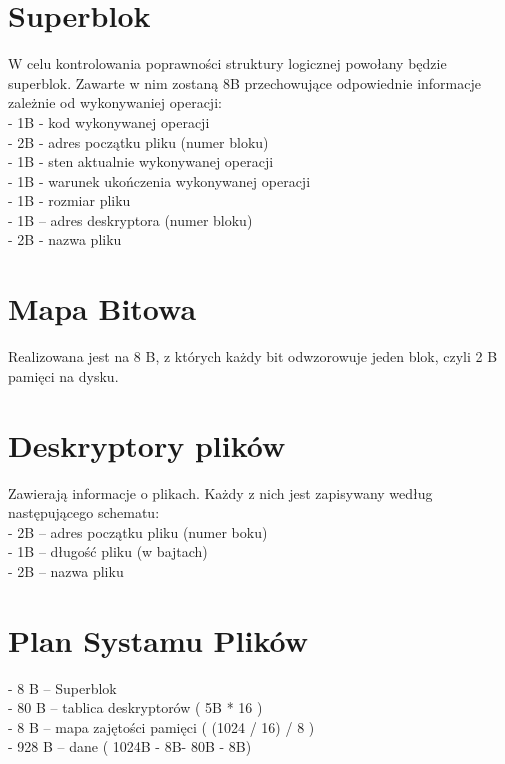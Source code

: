 \documentclass[paper=a4, fontsize=11pt]{scrartcl} %
\numberwithin{equation}{section} %
\numberwithin{figure}{section} %
\numberwithin{table}{section} %
\begin{document}
\section{Superblok}
W celu kontrolowania poprawności struktury logicznej powołany będzie superblok. Zawarte w nim zostaną 8B przechowujące odpowiednie informacje zależnie od wykonywaniej operacji:\\
- 1B - kod wykonywanej operacji\\
- 2B - adres początku pliku (numer bloku)\\
- 1B - sten aktualnie wykonywanej operacji\\
- 1B - warunek ukończenia wykonywanej operacji\\
- 1B - rozmiar pliku\\
- 1B – adres deskryptora (numer bloku)\\
- 2B - nazwa pliku\\

\section{Mapa Bitowa}
Realizowana jest na 8 B, z których każdy bit odwzorowuje jeden blok, czyli 2 B pamięci na dysku.

\section{Deskryptory plików}
Zawierają informacje o plikach. Każdy z nich jest zapisywany według następującego schematu:\\
- 2B – adres początku pliku (numer boku)\\
- 1B – długość pliku (w bajtach)\\ 
- 2B – nazwa pliku\\

\section{Plan Systamu Plików}
- 8 B – Superblok\\
- 80 B – tablica deskryptorów ( 5B * 16 )\\
- 8 B – mapa zajętości pamięci ( (1024 / 16) / 8 )\\
- 928 B – dane ( 1024B - 8B- 80B - 8B)\\
\end{document}
